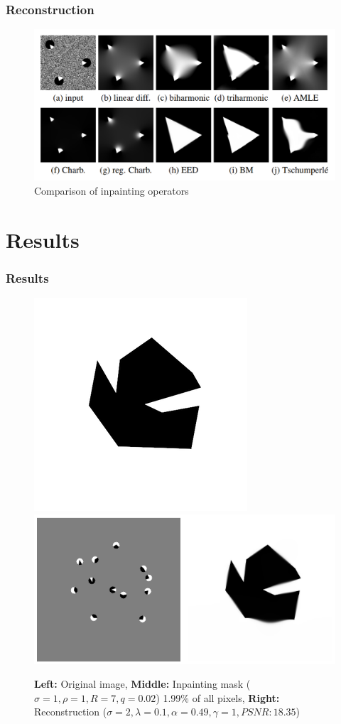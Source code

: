 \documentclass{beamer}
\begin{document}
    \begin{frame}[t]
        \frametitle{Reconstruction}
        \begin{figure}[htpb]
            \centering
            \includegraphics[width=0.8\linewidth]{../thesis/Images/diffops_compare.png}
            \caption{Comparison of inpainting operators~\cite{schmaltz14}}
        \end{figure}
    \end{frame}

    \section{Results}
    \begin{frame}
        \frametitle{Results}
        \begin{figure}[htpb]
            \centering
            \includegraphics[width=0.3\linewidth]{../images/binary/abstract1_small.png}
            \includegraphics[width=0.6\linewidth]{images/abstract2.png}
            \caption{ \textbf{Left:} Original image, \textbf{Middle:} Inpainting mask
                ($\sigma=1,\rho=1,R=7,q=0.02$) 1.99\% of all pixels, \textbf{Right:} Reconstruction
            ($\sigma=2,\lambda=0.1,\alpha=0.49,\gamma=1, PSNR: 18.35$) }
        \end{figure}        
    \end{frame}
\end{document}
